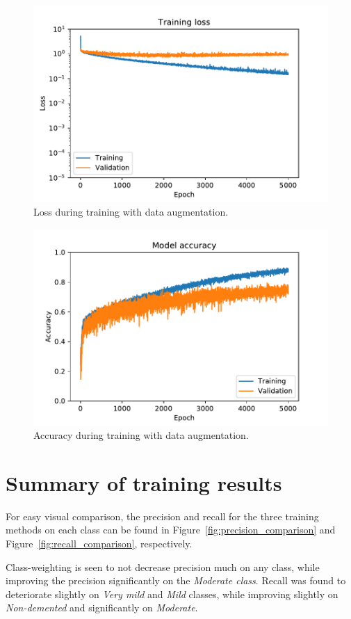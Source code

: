 \documentclass{kththesis}
\begin{document}
\begin{figure}[H]
  \centering
  \includegraphics[width=0.9\linewidth]{img/loss_data_augmentation.pdf}
  \caption{Loss during training with data augmentation.} \label{fig:loss_data_augmentation}
\end{figure}
\begin{figure}[H]
  \centering
  \includegraphics[width=0.9\linewidth]{img/accuracy_data_augmentation.pdf}
  \caption{Accuracy during training with data augmentation.}\label{fig:accuracy_data_augmentation} 
\end{figure}

\section{Summary of training results}
For easy visual comparison, the precision and recall for the three training methods on each class can be found in Figure~\ref{fig:precision_comparison} and Figure~\ref{fig:recall_comparison}, respectively.

Class-weighting is seen to not decrease precision much on any class, while improving the precision significantly on the \textit{Moderate class}. Recall was found to deteriorate slightly on \textit{Very mild} and \textit{Mild} classes, while improving slightly on \textit{Non-demented} and significantly on \textit{Moderate}.
\end{document}
